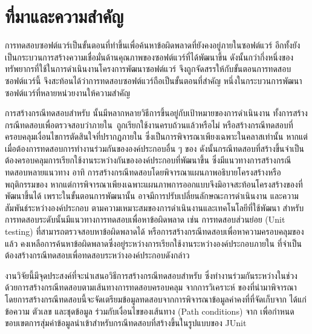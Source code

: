 \section{ที่มาและความสำคัญ} 
\label{sec:introduction}

การทดสอบซอฟต์แวร์เป็นขั้นตอนที่ทำขึ้นเพื่อค้นหาข้อผิดพลาดที่ยังคงอยู่ภายในซอฟต์แวร์ \cite{Myers:2011:AST:983238} 
อีกทั้งยังเป็นกระบวนการสร้างความเชื่อมั่นด้านคุณภาพของซอฟต์แวร์ที่ได้พัฒนาขึ้น ดังนั้นกว่ากึ่งหนึ่งของทรัพยากรที่ใช้ในการดำเนินงานโครงการพัฒนาซอฟต์แวร์
จึงถูกจัดสรรให้กับขั้นตอนการทดสอบซอฟต์แวร์นี้ \cite{Jackson2007, Tassey2002} จึงสะท้อนได้ว่าการทดสอบซอฟต์แวร์ถือเป็นขั้นตอนที่สำคัญ
หนึ่งในกระบวนการพัฒนาซอฟต์แวร์ที่หลายหน่วยงานให้ความสำคัญ

การสร้างกรณีทดสอบสำหรับ\FirstTimeDefine{\SUT}{\SUTEN} นั้นมีหลากหลายวิธีการขึ้นอยู่กับเป้าหมายของการดำเนินงาน 
ทั้งการสร้างกรณีทดสอบเพื่อตรวจสอบว่า{\method}ภายใน\FirstTimeDefine{\CUT}{\CUTEN}\ ถูกเรียกใช้งานครบถ้วนแล้วหรือไม่ \cite{6847360}
หรือสร้างกรณีทดสอบที่ครอบคลุมเงื่อนไขการตัดสินใจที่ปรากฏภายใน{\CUT} \cite{Luanghirun2016} ซึ่งเป็นการพิจารณาเพียงเฉพาะในคลาสเท่านั้น
หากแต่เมื่อต้องการทดสอบการทำงานร่วมกันขององค์ประกอบอื่น ๆ ของ\FirstTimeDefine{\SUT}{\SUTEN} 
ดังนั้นกรณีทดสอบที่สร้างขึ้นจำเป็นต้องครอบคลุมการเรียกใช้งานระหว่างกันขององค์ประกอบที่พัฒนาขึ้น
ซึ่งมีแนวทางการสร้างกรณีทดสอบหลายแนวทาง อาทิ 
การสร้างกรณีทดสอบโดยพิจารณาแผนภาพอธิบายโครงสร้างหรือพฤติกรรมของ{\softwareComponent} \cite{Panthi2012, Shirole2013}
หากแต่การพิจารณาเพียงเฉพาะแผนภาพการออกแบบจึงมิอาจสะท้อนโครงสร้างของ{\sourcecode}ที่พัฒนาขึ้นได้ 
เพราะในขั้นตอนการพัฒนานั้น อาจมีการปรับเปลี่ยนลักษณะการดำเนินงาน และความสัมพันธ์ระหว่างองค์ประกอบ 
ตามความเหมาะสมของการดำเนินงานและเทคโนโลยีที่ใช้พัฒนา 
สำหรับการทดสอบระดับ{\class}นั้นมีแนวทางการทดสอบเพื่อหาข้อผิดพลาด เช่น การทดสอบส่วนย่อย (Unit testing) ที่สามารถตรวจสอบหาข้อผิดพลาดได้
หรือการสร้างกรณีทดสอบเพื่อหาความครอบคลุมของ{\sourcecode} \cite{6847360, Luanghirun2016} แล้ว
คงเหลือการค้นหาข้อผิดพลาดซึ่งอยู่ระหว่างการเรียกใช้งานระหว่างองค์ประกอบภายใน{\sourcecode} 
ที่จำเป็นต้องสร้างกรณีทดสอบเพื่อทดสอบ{\Path}ระหว่างองค์ประกอบดังกล่าว

งานวิจัยนี้มีจุดประสงค์ที่จะนำเสนอวิธีการสร้างกรณีทดสอบสำหรับ{\sourcecode}
ซึ่งทำงานร่วมกันระหว่างในช่วง\FirstTimeDefine{\IntegrationTesting}{\IntegrationTestingEN} 
ด้วยการสร้างกรณีทดสอบตามเส้นทางการทดสอบครอบคลุม\FirstTimeDefine{\scg}{\scgEN} 
จากการวิเคราะห์\FirstTimeDefine{\StaticInformation}{\StaticInformationEN} 
ของ{\sourcecode}ที่นำมาพิจารณา โดยการสร้างกรณีทดสอบนี้จะจัดเตรียมข้อมูลทดสอบจากการพิจารณาข้อมูลค่าคงที่ที่จัดเก็บจาก{\sourcecode} 
ได้แก่ ข้อความ ตัวเลข และชุดข้อมูล ร่วมกับเงื่อนไขของเส้นทาง (Path conditions) จาก{\cfg} 
เพื่อกำหนดขอบเขตการสุ่มค่าข้อมูลนำเข้าสำหรับกรณีทดสอบที่สร้างขึ้นในรูปแบบของ JUnit
